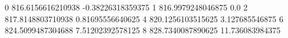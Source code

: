 0 816.6156616210938 -0.38226318359375
1 816.9979248046875 0.0
2 817.8148803710938 0.81695556640625
4 820.1256103515625 3.127685546875
6 824.5099487304688 7.51202392578125
8 828.7340087890625 11.736083984375
